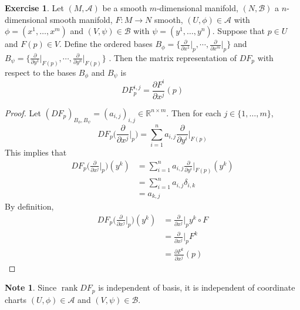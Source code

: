 \documentclass{book}
\theoremstyle{definition}
\newtheorem{note}[definition]{Note}
\newtheorem{ex}[definition]{Exercise}
\newcommand{\del}{\delta}
\newcommand{\R}{\mathbb{R}}
\newcommand{\MA}{\mathcal{A}}
\newcommand{\MB}{\mathcal{B}}
\DeclareMathOperator{\rnk}{rank}
\DeclareMathOperator*{\0}{\mbf{0}}
\DeclareMathOperator*{\1}{\mbf{1}}
\newcommand{\p}{\partial}
\begin{document}
	\begin{ex}
		Let $(M, \MA)$ be a smooth $m$-dimensional manifold, $(N, \MB)$ a $n$-dimensional smooth manifold, $F: M \rightarrow N$ smooth, $(U, \phi) \in \MA$ with $\phi = (x^1, \dots, x^m)$ and $(V, \psi) \in \MB$ with $\psi = (y^1, \dots, y^n)$. Suppose that $p \in U$ and $F(p) \in V$. Define the ordered bases $B_\phi = \bigg \{\frac{\p}{\p x^1} \bigg|_p, \cdots, \frac{\p}{\p x^m} \bigg|_p \bigg \}$ and $B_{\psi} = \bigg \{\frac{\p}{\p y^1} \bigg|_{F(p)}, \cdots, \frac{\p}{\p y^n} \bigg|_{F(p)} \bigg \}$ .
		Then the matrix representation of $DF_p$ with respect to the bases
		$B_{\phi}$ and $B_{\psi}$ is $$ DF_p^{i,j} =  \frac{\p F^i}{\p x^j}(p)$$
	\end{ex}

	\begin{proof}
		Let $(DF_p)_{B_\phi, B_{\psi}} = (a_{i,j})_{i,j} \in \R^{n \times m}$. Then for each $j \in \{1, \dots, m\}$, $$DF_p \bigg(\frac{\p }{\p x^j} \bigg|_p\bigg) = \sum_{i=1}^n a_{i,j}\frac{\p }{\p y^i} \bigg|_{F(p)}$$
		This implies that 
		\begin{align*}
			DF_p \bigg(\frac{\p }{\p x^j} \bigg|_p\bigg) (y^k )
			&=   \sum_{i=1}^n a_{i,j}\frac{\p }{\p y^i} \bigg|_{F(p)} (y^k) \\
			&= \sum_{i=1}^n a_{i,j} \del_{i,k} \\
			&= a_{k, j}
		\end{align*}
		By definition, 
		\begin{align*}
			DF_p \bigg(\frac{\p }{\p x^j} \bigg|_p\bigg) (y^k )
			&=  \frac{\p }{\p x^j} \bigg|_p y^k \circ F \\
			&= \frac{\p }{\p x^j} \bigg|_p F^k \\
			&= \frac{\p F^k}{\p x^j} (p)
		\end{align*}
	\end{proof}
	
	
	\begin{note}
	Since $\rnk DF_p$ is independent of basis, it is independent of coordinate charts $(U, \phi) \in \MA$ and $(V, \psi) \in \MB$. 
	\end{note}	
	
	
	
	

	
	



	
	
	
	
	
	
	
	
\end{document}
